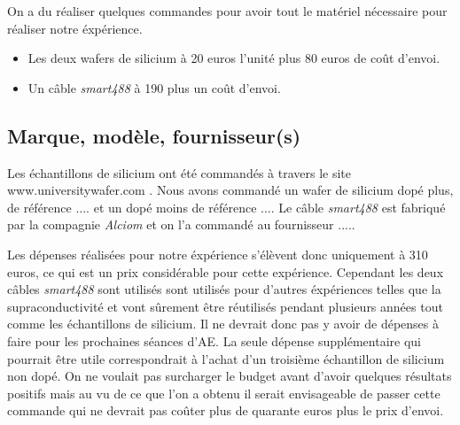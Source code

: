 \bigskip
On a du réaliser quelques commandes pour avoir tout le matériel nécessaire pour réaliser notre éxpérience.

\begin{itemize}
  \item Les deux wafers de silicium à 20 euros l'unité plus 80 euros de coût d'envoi.
  \item Un câble \emph{smart488} à 190 plus un coût d'envoi.
\end{itemize}

\subsection{Marque, modèle, fournisseur(s)}
Les échantillons de silicium ont été commandés à travers le site www.universitywafer.com . Nous avons commandé un wafer de silicium dopé plus, de référence .... et un dopé moins de référence ....
Le câble \emph{smart488} est fabriqué par la compagnie \emph{Alciom} et on l'a commandé au fournisseur .....

Les dépenses réalisées pour notre éxpérience s'élèvent donc uniquement à 310 euros, ce qui est un prix considérable pour cette expérience. Cependant les deux câbles \emph{smart488} sont utilisés sont utilisés pour d'autres éxpériences telles que la supraconductivité et vont sûrement être réutilisés pendant plusieurs années tout comme les échantillons de silicium. Il ne devrait donc pas y avoir de dépenses à faire pour les prochaines séances d'AE.
La seule dépense supplémentaire qui pourrait être utile correspondrait à l'achat d'un troisième échantillon de silicium non dopé. On ne voulait pas surcharger le budget avant d'avoir quelques résultats positifs mais au vu de ce que l'on a obtenu il serait envisageable de passer cette commande qui ne devrait pas coûter plus de quarante euros plus le prix d'envoi.
